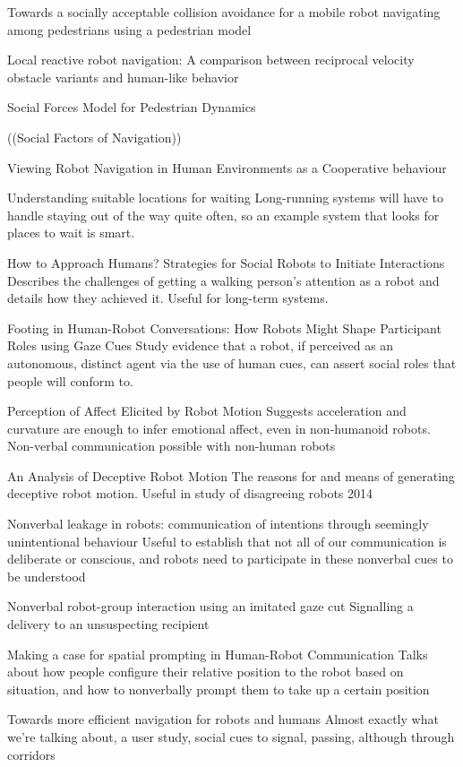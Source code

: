 \documentclass{sfuthesis}
\begin{document}
Towards a socially acceptable collision avoidance for a mobile robot navigating among pedestrians using a pedestrian model

Local reactive robot navigation: A comparison between reciprocal velocity obstacle variants and human-like behavior 

Social Forces Model for Pedestrian Dynamics


((Social Factors of Navigation))	

Viewing Robot Navigation in Human Environments as a Cooperative behaviour

Understanding suitable locations for waiting	Long-running systems will have to handle staying out of the way quite often, so an example system that looks for places to wait is smart.	

How to Approach Humans? Strategies for Social Robots to Initiate Interactions	Describes the challenges of getting a walking person's attention as a robot and details how they achieved it. Useful for long-term systems.	

Footing in Human-Robot Conversations: How Robots Might Shape Participant Roles using Gaze Cues	Study evidence that a robot, if perceived as an autonomous, distinct agent via the use of human cues, can assert social roles that people will conform to.	

Perception of Affect Elicited by Robot Motion	Suggests acceleration and curvature are enough to infer emotional affect, even in non-humanoid robots. Non-verbal communication possible with non-human robots	

An Analysis of Deceptive Robot Motion	The reasons for and means of generating deceptive robot motion. Useful in study of disagreeing robots	2014

Nonverbal leakage in robots: communication of intentions through seemingly unintentional behaviour	Useful to establish that not all of our communication is deliberate or conscious, and robots need to participate in these nonverbal cues to be understood	

Nonverbal robot-group interaction using an imitated gaze cut	Signalling a delivery to an unsuspecting recipient

Making a case for spatial prompting in Human-Robot Communication	Talks about how people configure their relative position to the robot based on situation, and how to nonverbally prompt them to take up a certain position	




Towards more efficient navigation for robots and humans	Almost exactly what we're talking about, a user study, social cues to signal, passing, although through corridors	
\end{document}
